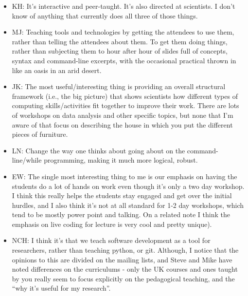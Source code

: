 \documentclass{article}
\begin{document}
\begin{itemize}

  \item KH: It's interactive and peer-taught. It's also directed at
    scientists. I don't know of anything that currently does all three
    of those things.

  \item MJ: Teaching tools and technologies by getting the attendees
    to use them, rather than telling the attendees about them. To get
    them doing things, rather than subjecting them to hour after hour
    of slides full of concepts, syntax and command-line excerpts, with
    the occasional practical thrown in like an oasis in an arid
    desert.

  \item JK: The most useful/interesting thing is providing an overall
    structural framework (i.e., the big picture) that shows scientists
    how different types of computing skills/activities fit together to
    improve their work. There are lots of workshops on data analysis
    and other specific topics, but none that I'm aware of that focus
    on describing the house in which you put the different pieces of
    furniture.

  \item LN: Change the way one thinks about going about on the
    command-line/while programming, making it much more logical,
    robust.

  \item EW: The single most interesting thing to me is our emphasis on
    having the students do a lot of hands on work even though it's
    only a two day workshop. I think this really helps the students
    stay engaged and get over the initial hurdles, and I also think
    it's not at all standard for 1-2 day workshops, which tend to be
    mostly power point and talking. On a related note I think the
    emphasis on live coding for lecture is very cool and pretty
    unique).

  \item NCH: I think it's that we teach software development as a tool
    for researchers, rather than teaching python, or git. Although, I
    notice that the opinions to this are divided on the mailing lists,
    and Steve and Mike have noted differences on the curriculums -
    only the UK courses and ones taught by you really seem to focus
    explicitly on the pedagogical teaching, and the ``why it's useful
    for my research''.


\end{itemize}
\end{document}
